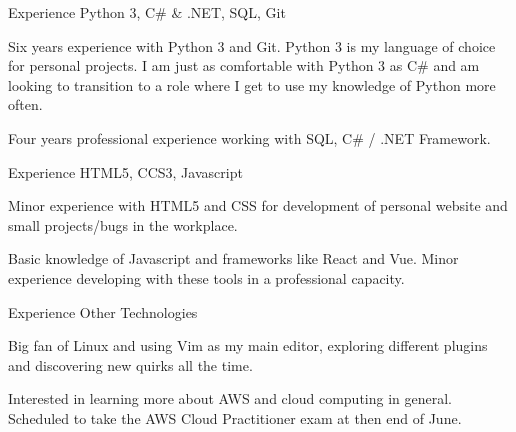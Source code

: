 \begin{cventries}
  \cventry
    {Experience}
    {Python 3, C\# \& .NET, SQL, Git}
    {}
    {}
    {
      \begin{cvitems}
		  \item Six years experience with Python 3 and Git. Python 3 is my language of choice for personal projects. I am just as comfortable with Python 3 as C\# and am looking to transition to a role where I get to use my knowledge of Python more often.
		  \item Four years professional experience working with SQL, C\# / .NET Framework.
      \end{cvitems}
    }
  \cventry
    {Experience}
    {HTML5, CCS3, Javascript}
    {}
    {}
    {
      \begin{cvitems}
	      \item Minor experience with HTML5 and CSS for development of personal website and small projects/bugs in the workplace.
		  \item Basic knowledge of Javascript and frameworks like React and Vue. Minor experience developing with these tools in a professional capacity.
      \end{cvitems}
    }
  \cventry
    {Experience}
    {Other Technologies}
    {}
    {}
    {
      \begin{cvitems}
	      \item Big fan of Linux and using Vim as my main editor, exploring different plugins and discovering new quirks all the time.
		  \item Interested in learning more about AWS and cloud computing in general. Scheduled to take the AWS Cloud Practitioner exam at then end of June.
      \end{cvitems}
    }
\vspace*{-2pt}
\end{cventries}


